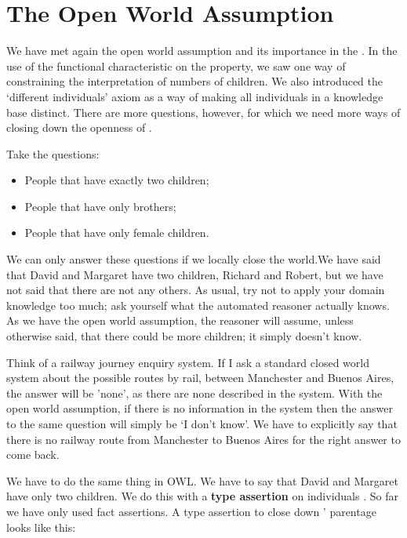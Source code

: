 \section{The Open World Assumption}

We have met again the open world assumption and its importance in the \fhkb. In the use of the functional characteristic on the  property, we saw one way of constraining the interpretation of numbers of children. We also introduced the `different individuals' axiom as a way of making all individuals in a knowledge base distinct. There are more questions, however, for which we need more ways of closing down the openness of \owlii.

Take the questions:
\begin{itemize}
\item People that have exactly two children;
\item People that have only brothers;
\item People that have only female children.
\end{itemize}

We can only answer these questions if we locally close the world.\herebedragons  We have said that David and Margaret have two children, Richard and Robert, but we have not said that there are not any others. As usual, try not to apply your domain knowledge too much; ask yourself what the automated reasoner actually knows. As we have the open world assumption, the reasoner will assume, unless otherwise said, that there could be more children; it simply doesn't know.

Think of a railway journey enquiry system. If I ask a standard closed world system about the possible routes by rail, between Manchester and Buenos Aires, the answer will be 'none', as there are none described in the system. With the open world assumption, if there is no information in the system then the answer to the same question will simply be `I don't know'. We have to explicitly say that there is no railway route from Manchester to Buenos Aires for the right answer to come back.

We have to do the same thing in OWL. We have to say that David and Margaret have only two children. We do this with a \textbf{type assertion} on individuals . So far we have only used fact assertions. A type assertion to close down \ds' parentage looks like this:
\\\\

